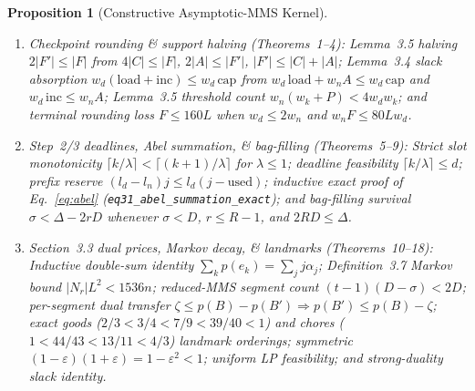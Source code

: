 \documentclass[11pt,twocolumn]{article}
\newtheorem{proposition}{Proposition}
\begin{document}
\begin{proposition}[Constructive Asymptotic-MMS Kernel]\label{prop:lean}
\leavevmode
\begin{enumerate}[leftmargin=*,nosep]
  \item \emph{Checkpoint rounding \& support halving (Theorems~1--4):} Lemma~3.5 halving $2|F'| \le |F|$ from $4|C| \le |F|$, $2|A| \le |F'|$, $|F'| \le |C|+|A|$; Lemma~3.4 slack absorption $w_d(\mathrm{load}+\mathrm{inc}) \le w_d\,\mathrm{cap}$ from $w_d\,\mathrm{load}+w_n A \le w_d\,\mathrm{cap}$ and $w_d\,\mathrm{inc} \le w_n A$; Lemma~3.5 threshold count $w_n(w_k+P) < 4 w_d w_k$; and terminal rounding loss $F \le 160L$ when $w_d \le 2w_n$ and $w_n F \le 80 L w_d$.
  \item \emph{Step~2/3 deadlines, Abel summation, \& bag-filling (Theorems~5--9):} Strict slot monotonicity $\lceil k/\lambda\rceil < \lceil(k+1)/\lambda\rceil$ for $\lambda \le 1$; deadline feasibility $\lceil k/\lambda\rceil \le d$; prefix reserve $(l_d-l_n)j \le l_d(j-\mathrm{used})$; inductive exact proof of Eq.~\eqref{eq:abel} (\texttt{eq31\_abel\_summation\_exact}); and bag-filling survival $\sigma < \Delta - 2rD$ whenever $\sigma < D$, $r \le R-1$, and $2RD \le \Delta$.
  \item \emph{Section~3.3 dual prices, Markov decay, \& landmarks (Theorems~10--18):} Inductive double-sum identity $\sum_k p(e_k) = \sum_j j\alpha_j$; Definition~3.7 Markov bound $|N_r|L^2 < 1536 n$; reduced-MMS segment count $(t-1)(D-\sigma) < 2D$; per-segment dual transfer $\zeta \le p(B)-p(B') \Rightarrow p(B') \le p(B)-\zeta$; exact goods ($2/3 < 3/4 < 7/9 < 39/40 < 1$) and chores ($1 < 44/43 < 13/11 < 4/3$) landmark orderings; symmetric $(1-\varepsilon)(1+\varepsilon) = 1-\varepsilon^2 < 1$; uniform LP feasibility; and strong-duality slack identity.
\end{enumerate}
\end{proposition}
\end{document}
